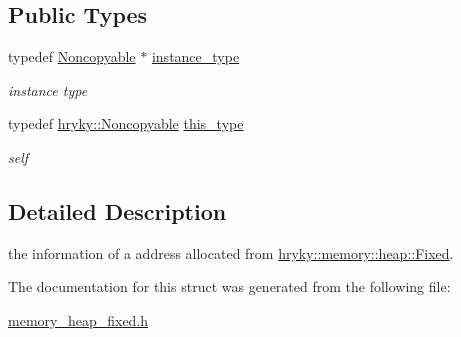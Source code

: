 \subsection*{Public Types}
\begin{DoxyCompactItemize}
\item 
\hypertarget{classhryky_1_1_noncopyable_aaf87abb55f700af85ecb0895f6178821}{typedef \hyperlink{classhryky_1_1_noncopyable}{Noncopyable} $\ast$ \hyperlink{classhryky_1_1_noncopyable_aaf87abb55f700af85ecb0895f6178821}{instance\-\_\-type}}\label{classhryky_1_1_noncopyable_aaf87abb55f700af85ecb0895f6178821}

\begin{DoxyCompactList}\small\item\em instance type \end{DoxyCompactList}\item 
\hypertarget{classhryky_1_1_noncopyable_acf13ad1c98a76247a561dff514979da5}{typedef \hyperlink{classhryky_1_1_noncopyable}{hryky\-::\-Noncopyable} \hyperlink{classhryky_1_1_noncopyable_acf13ad1c98a76247a561dff514979da5}{this\-\_\-type}}\label{classhryky_1_1_noncopyable_acf13ad1c98a76247a561dff514979da5}

\begin{DoxyCompactList}\small\item\em self \end{DoxyCompactList}\end{DoxyCompactItemize}


\subsection{Detailed Description}
the information of a address allocated from \hyperlink{classhryky_1_1memory_1_1heap_1_1_fixed}{hryky\-::memory\-::heap\-::\-Fixed}. 

The documentation for this struct was generated from the following file\-:\begin{DoxyCompactItemize}
\item 
\hyperlink{memory__heap__fixed_8h}{memory\-\_\-heap\-\_\-fixed.\-h}\end{DoxyCompactItemize}
